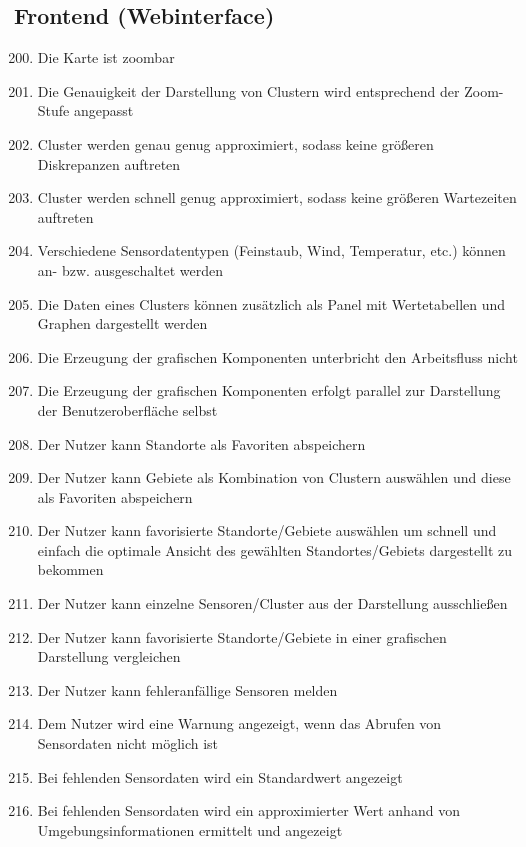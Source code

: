 \subsection{Frontend (Webinterface)}
\begin{enumerate}[label=\textbf{WK\arabic{enumi}0}]
	\setcounter{enumi}{199}
	\item Die Karte ist zoombar
	\item Die Genauigkeit der Darstellung von Clustern wird entsprechend der Zoom-Stufe angepasst
	\item Cluster werden genau genug approximiert, sodass keine größeren Diskrepanzen auftreten
	\item Cluster werden schnell genug approximiert, sodass keine größeren Wartezeiten auftreten
	\item Verschiedene Sensordatentypen (Feinstaub, Wind, Temperatur, etc.) können an- bzw. ausgeschaltet werden
	\item Die Daten eines Clusters können zusätzlich als Panel mit Wertetabellen und Graphen dargestellt werden
	\item Die Erzeugung der grafischen Komponenten unterbricht den Arbeitsfluss nicht
	\item Die Erzeugung der grafischen Komponenten erfolgt parallel zur Darstellung der Benutzeroberfläche selbst
	\item Der Nutzer kann Standorte als Favoriten abspeichern
	\item Der Nutzer kann Gebiete als Kombination von Clustern auswählen und diese als Favoriten abspeichern
	\item Der Nutzer kann favorisierte Standorte/Gebiete auswählen um schnell und einfach die optimale Ansicht des gewählten Standortes/Gebiets dargestellt zu bekommen
	\item Der Nutzer kann einzelne Sensoren/Cluster aus der Darstellung ausschließen
	\item Der Nutzer kann favorisierte Standorte/Gebiete in einer grafischen Darstellung vergleichen
	\item Der Nutzer kann fehleranfällige Sensoren melden
	\item Dem Nutzer wird eine Warnung angezeigt, wenn das Abrufen von Sensordaten nicht möglich ist %
	\item Bei fehlenden Sensordaten wird ein Standardwert angezeigt
	\item Bei fehlenden Sensordaten wird ein approximierter Wert anhand von Umgebungsinformationen ermittelt und angezeigt

\end{enumerate}
